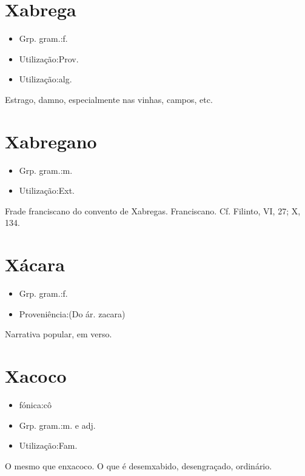 \section{Xabrega}
\begin{itemize}
\item {Grp. gram.:f.}
\end{itemize}
\begin{itemize}
\item {Utilização:Prov.}
\end{itemize}
\begin{itemize}
\item {Utilização:alg.}
\end{itemize}
Estrago, damno, especialmente nas vinhas, campos, etc.
\section{Xabregano}
\begin{itemize}
\item {Grp. gram.:m.}
\end{itemize}
\begin{itemize}
\item {Utilização:Ext.}
\end{itemize}
Frade franciscano do convento de Xabregas.
Franciscano. Cf. Filinto, VI, 27; X, 134.
\section{Xácara}
\begin{itemize}
\item {Grp. gram.:f.}
\end{itemize}
\begin{itemize}
\item {Proveniência:(Do ár. \textunderscore zacara\textunderscore )}
\end{itemize}
Narrativa popular, em verso.
\section{Xacoco}
\begin{itemize}
\item {fónica:cô}
\end{itemize}
\begin{itemize}
\item {Grp. gram.:m.  e  adj.}
\end{itemize}
\begin{itemize}
\item {Utilização:Fam.}
\end{itemize}
O mesmo que \textunderscore enxacoco\textunderscore .
O que é desemxabido, desengraçado, ordinário.

